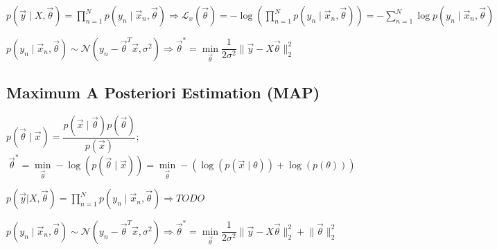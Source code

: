 \documentclass[]{article}
\begin{document}
	$p(\vec{y}\mid X,\vec{\theta})=\prod\limits_{n=1}^N p(y_n\mid\vec{x}_n,\vec{\theta}) \Rightarrow \mathcal{L}_x(\vec{\theta}) = - \log \left(\prod\limits_{n=1}^N p(y_n\mid\vec{x}_n,\vec{\theta})\right) = -\sum\limits_{n=1}^N \log p(y_n\mid\vec{x}_n,\vec{\theta})$
	
	$p(y_n\mid\vec{x}_n,\vec{\theta}) \sim \mathcal{N}(y_n - \vec{\theta}^T\vec{x}, \sigma^2) \Rightarrow \vec{\theta}^* = \min\limits_{\vec{\theta}} \dfrac{1}{2\sigma^2} \lVert\vec{y}-X\vec{\theta}\rVert_2^2$
	
	\subsection{Maximum A Posteriori Estimation (MAP)}
	
	$p(\vec{\theta}\mid\vec{x}) = \dfrac{p(\vec{x}\mid\vec{\theta}) p(\vec{\theta})}{p(\vec{x})}$;	
	$\ \vec{\theta}^* = \min\limits_{\vec{\theta}} -\log(p(\vec{\theta}\mid\vec{x})) =  \min\limits_{\vec{\theta}} - (\log (p(\vec{x}\mid\theta)) + \log(p(\theta)))$
	
	$p(\vec{y}|X,\vec{\theta}) = \prod\limits_{n=1}^N p(y_n\mid\vec{x}_n,\vec{\theta}) \Rightarrow TODO$
	
	$p(y_n\mid\vec{x}_n,\vec{\theta}) \sim \mathcal{N}(y_n - \vec{\theta}^T\vec{x}, \sigma^2) \Rightarrow \vec{\theta}^* = \min\limits_{\vec{\theta}} \dfrac{1}{2\sigma^2} \lVert\vec{y}-X\vec{\theta}\rVert_2^2 
	 + \lVert\vec{\theta}\rVert_2^2$
	
\end{document}
